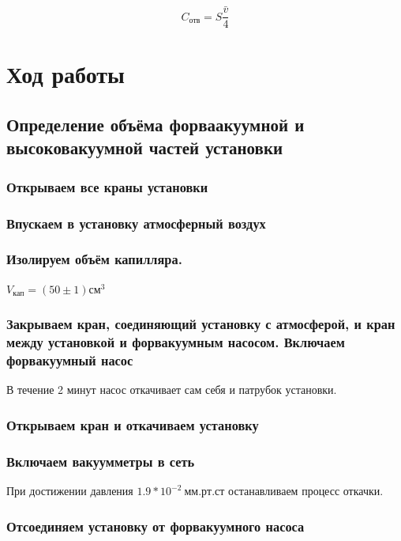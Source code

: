 \documentclass[a4paper, 12pt]{article}
\begin{document}
    \begin{equation}
    C_{отв}=S\frac{\bar v}{4}
    \end{equation}

    \section{Ход работы}
    \subsection{Определение объёма форваакуумной и высоковакуумной частей установки}
        \subsubsection{Открываем все краны установки}

        \subsubsection{Впускаем в установку атмосферный воздух}

        \subsubsection{Изолируем объём капилляра.}

            $V_{кап} = (50 \pm 1) см^3$

        \subsubsection{Закрываем кран, соединяющий установку с атмосферой, и кран между установкой и форвакуумным насосом. Включаем форвакуумный насос}

            В течение 2 минут насос откачивает сам себя и патрубок установки.

        \subsubsection{Открываем кран и откачиваем установку}

        \subsubsection{Включаем вакуумметры в сеть}

            При достижении давления $ 1.9*10^{-2}~мм.рт.ст $ останавливаем процесс откачки.

        \subsubsection{Отсоединяем установку от форвакуумного насоса}
\end{document}
